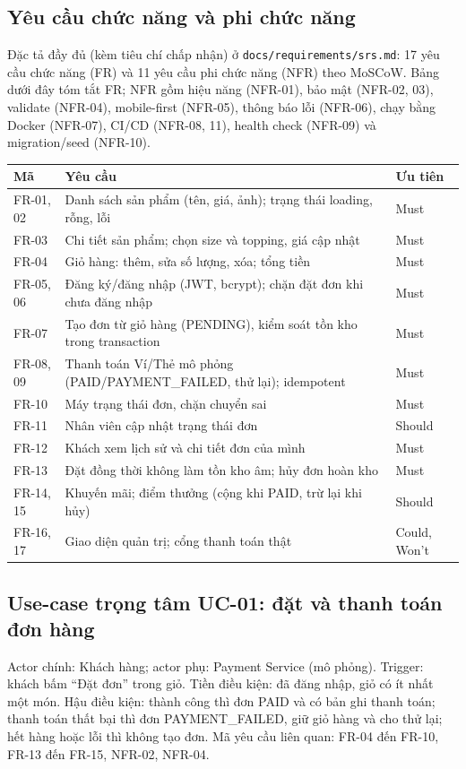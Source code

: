 \documentclass[a4paper]{article}
\begin{document}
\subsection{Yêu cầu chức năng và phi chức năng}
Đặc tả đầy đủ (kèm tiêu chí chấp nhận) ở \texttt{docs/requirements/srs.md}: 17 yêu cầu chức năng (FR) và 11 yêu cầu phi chức năng (NFR) theo MoSCoW. Bảng dưới đây tóm tắt FR; NFR gồm hiệu năng (NFR-01), bảo mật (NFR-02, 03), validate (NFR-04), mobile-first (NFR-05), thông báo lỗi (NFR-06), chạy bằng Docker (NFR-07), CI/CD (NFR-08, 11), health check (NFR-09) và migration/seed (NFR-10).
\begin{center}
\small\everymath{}
\label{tab:fr}
\begin{longtable}{@{}p{1.2cm}p{10.2cm}p{1.8cm}@{}}
\toprule \textbf{Mã} & \textbf{Yêu cầu} & \textbf{Ưu tiên} \\ \midrule \endhead
FR-01, 02 & Danh sách sản phẩm (tên, giá, ảnh); trạng thái loading, rỗng, lỗi & Must \\
FR-03 & Chi tiết sản phẩm; chọn size và topping, giá cập nhật & Must \\
FR-04 & Giỏ hàng: thêm, sửa số lượng, xóa; tổng tiền & Must \\
FR-05, 06 & Đăng ký/đăng nhập (JWT, bcrypt); chặn đặt đơn khi chưa đăng nhập & Must \\
FR-07 & Tạo đơn từ giỏ hàng (PENDING), kiểm soát tồn kho trong transaction & Must \\
FR-08, 09 & Thanh toán Ví/Thẻ mô phỏng (PAID/PAYMENT\_FAILED, thử lại); idempotent & Must \\
FR-10 & Máy trạng thái đơn, chặn chuyển sai & Must \\
FR-11 & Nhân viên cập nhật trạng thái đơn & Should \\
FR-12 & Khách xem lịch sử và chi tiết đơn của mình & Must \\
FR-13 & Đặt đồng thời không làm tồn kho âm; hủy đơn hoàn kho & Must \\
FR-14, 15 & Khuyến mãi; điểm thưởng (cộng khi PAID, trừ lại khi hủy) & Should \\
FR-16, 17 & Giao diện quản trị; cổng thanh toán thật & Could, Won't \\
\bottomrule
\end{longtable}
\end{center}

\subsection{Use-case trọng tâm UC-01: đặt và thanh toán đơn hàng}
Actor chính: Khách hàng; actor phụ: Payment Service (mô phỏng). Trigger: khách bấm ``Đặt đơn'' trong giỏ. Tiền điều kiện: đã đăng nhập, giỏ có ít nhất một món. Hậu điều kiện: thành công thì đơn PAID và có bản ghi thanh toán; thanh toán thất bại thì đơn PAYMENT\_FAILED, giữ giỏ hàng và cho thử lại; hết hàng hoặc lỗi thì không tạo đơn. Mã yêu cầu liên quan: FR-04 đến FR-10, FR-13 đến FR-15, NFR-02, NFR-04.
\end{document}
